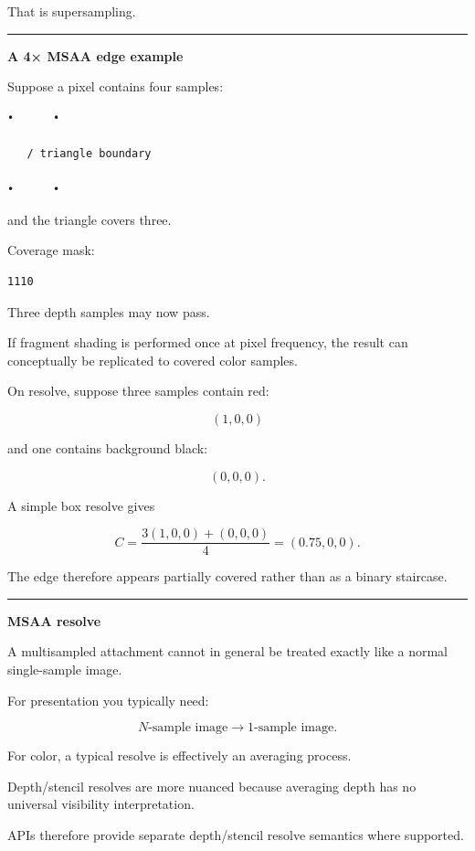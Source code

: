 That is supersampling.

\begin{center}\rule{0.5\linewidth}{0.5pt}\end{center}

\textbf{A 4× MSAA edge example}

Suppose a pixel contains four samples:

\begin{verbatim}
•      •

   / triangle boundary

•      •
\end{verbatim}

and the triangle covers three.

Coverage mask:

\begin{verbatim}
1110
\end{verbatim}

Three depth samples may now pass.

If fragment shading is performed once at pixel frequency, the result can conceptually be replicated to covered color samples.

On resolve, suppose three samples contain red:

\[
(1,0,0)
\]

and one contains background black:

\[
(0,0,0).
\]

A simple box resolve gives

\[
C=
\frac{3(1,0,0)+(0,0,0)}4
=
(0.75,0,0).
\]

The edge therefore appears partially covered rather than as a binary staircase.

\begin{center}\rule{0.5\linewidth}{0.5pt}\end{center}

\textbf{MSAA resolve}

A multisampled attachment cannot in general be treated exactly like a normal single-sample image.

For presentation you typically need:

\[
N\text{-sample image}
\rightarrow
1\text{-sample image}.
\]

For color, a typical resolve is effectively an averaging process.

Depth/stencil resolves are more nuanced because averaging depth has no universal visibility interpretation.

APIs therefore provide separate depth/stencil resolve semantics where supported.

